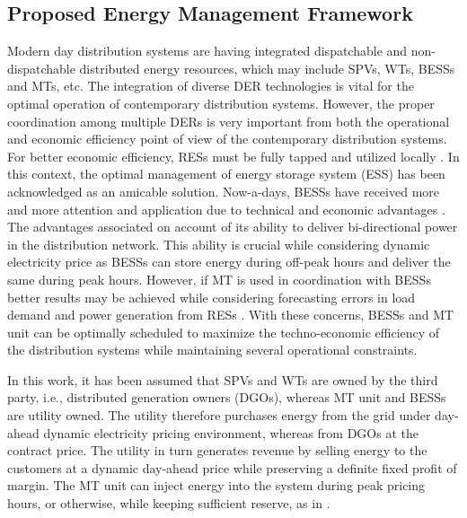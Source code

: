 \documentclass[journal]{IEEEtran}
\begin{document}
\subsection{Proposed Energy Management Framework}\label{section:EMF}
Modern day distribution systems are having integrated dispatchable and non-dispatchable distributed energy resources, which may include SPVs, WTs, BESSs and MTs, etc. The integration of diverse DER technologies is vital for the optimal operation of contemporary distribution systems. However, the proper coordination among multiple DERs is very important from both the operational and economic efficiency point of view of the contemporary distribution systems. For better economic efficiency, RESs must be fully tapped and utilized locally \cite{8353004,6662462}. In this context, the optimal management of energy storage system (ESS) has been acknowledged as an amicable solution. Now-a-days, BESSs have received more and more attention and application due to technical and economic advantages \cite{6305498}. The advantages associated on account of its ability to deliver bi-directional power in the distribution network. This ability is crucial while considering dynamic electricity price as BESSs can store energy during off-peak hours and deliver the same during peak hours. However, if MT is used in coordination with BESSs better results may be achieved while considering forecasting errors in load demand and power generation from RESs \cite{8353004}. With these concerns, BESSs and MT unit can be optimally scheduled to maximize the techno-economic efficiency of the distribution systems while maintaining several operational constraints.
%	
\par In this work, it has been assumed that SPVs and WTs are owned by the third party, i.e., distributed generation owners (DGOs), whereas MT unit and BESSs are utility owned. The utility therefore purchases energy from the grid under day-ahead dynamic electricity pricing environment, whereas from DGOs at the contract price. The utility in turn generates revenue by selling energy to the customers at a dynamic day-ahead price while preserving a definite fixed profit of margin. The MT unit can inject energy into the system during peak pricing hours, or otherwise, while keeping sufficient reserve, as in \cite{8353004}. 
%	
\end{document}
